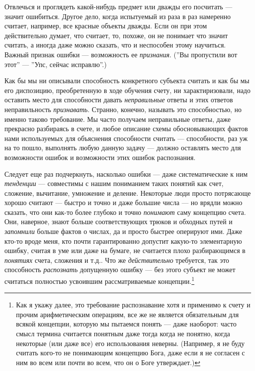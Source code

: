 \documentclass[12pt]{book}
\begin{document}
Отвлечься и проглядеть какой-нибудь предмет или дважды его посчитать --- значит ошибиться. Другое дело, когда испытуемый из раза в раз намеренно считает, например, все красные объекты дважды. Если он при этом действительно думает, что считает, то, похоже, он не понимает что значит считать, а иногда даже можно сказать, что и неспособен этому научиться. Важный признак ошибки --- возможность ее \textit{признания}. (''Вы пропустили вот этот'' --- ''Упс, сейчас исправлю''.)

Как бы мы ни описывали способность конкретного субъекта считать и как бы мы его диспозицию, преобретенную в ходе обучения счету, ни характиризовали, надо оставить место для способности давать \textit{неправильные} ответы и этих ответов неправильность \textit{признавать}. Странно, конечно, называть это способностью, но именно таково требование. Мы часто получаем неправильные ответы, даже прекрасно разбираясь в счете, и любое описание схемы обосновывающих фактов нами используемых для объяснения способности считать --- способности, раз уж на то пошло, выполнять любую данную задачу --- должно оставлять место для возможности ошибок и возможности этих ошибок распознания.

Следует еще раз подчеркнуть, насколько ошибки --- даже систематические к ним \textit{тенденции} --- совместимы с нашим пониманием таких понятий как счет, сложение, вычитание, умножение и деление. Некоторые люди просто потрясающе хорошо считают --- быстро и точно и даже большие числа --- но врядли можно сказать, что они как-то более глубоко и точно \textit{понимают} саму концепцию счета. Они, наверное, знают больше соответствующих трюков и обходных путей и \textit{запомнили} больше фактов о числах, да и просто быстрее оперируют ими. Даже кто-то вроде меня, кто почти гарантированно допустит какую-то элементарную ошибку, считая в уме или даже на бумаге, не считается плохо разбирающимся в \textit{понятиях} счета, сложения и т.д.. Что же \textit{действительно} требуется, так это способность \textit{распознать} допущенную ошибку --- без этого субъект не может считаться полностью усвоившим рассматриваемые концепции.\footnote{Как я укажу далее, это требование распознавание хотя и применимо к счету и прочим арифметическим операциям, все же не является обязательным для всякой концепции, которую мы пытаемся понять --- даже наоборот: часто смысл термина считается понятным даже тогда когда не понятно, когда некоторые (или даже все) его использования неверны. (Например, я не буду считать кого-то не понимающим концепцию Бога, даже если я не согласен с ним во всем или почти во всем, что он о Боге утверждает.)}
\end{document}
